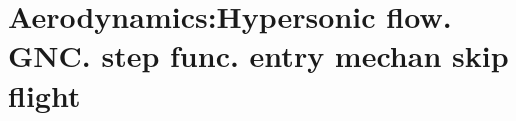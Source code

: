 \section{ Aerodynamics:Hypersonic flow. GNC. step func. entry mechan skip flight }\label{sec:q4}    
